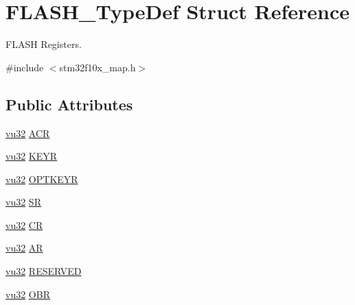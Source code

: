 \hypertarget{struct_f_l_a_s_h___type_def}{}\section{F\+L\+A\+S\+H\+\_\+\+Type\+Def Struct Reference}
\label{struct_f_l_a_s_h___type_def}


F\+L\+A\+SH Registers.  




{\ttfamily \#include $<$stm32f10x\+\_\+map.\+h$>$}

\subsection*{Public Attributes}
\begin{DoxyCompactItemize}
\item 
\hyperlink{agilefox_2library_2inc_2stm32f10x__type_8h_a6e2761f0a1011f84ed96b946f2c8a563}{vu32} \hyperlink{struct_f_l_a_s_h___type_def_aa1cc4da14ac887fbf7f6cef19179d8ba}{A\+CR}
\item 
\hyperlink{agilefox_2library_2inc_2stm32f10x__type_8h_a6e2761f0a1011f84ed96b946f2c8a563}{vu32} \hyperlink{struct_f_l_a_s_h___type_def_a88e0901a9f9b6c157448a2817c4f1c7f}{K\+E\+YR}
\item 
\hyperlink{agilefox_2library_2inc_2stm32f10x__type_8h_a6e2761f0a1011f84ed96b946f2c8a563}{vu32} \hyperlink{struct_f_l_a_s_h___type_def_af5b4bedcba9817f71402bf0718946f4c}{O\+P\+T\+K\+E\+YR}
\item 
\hyperlink{agilefox_2library_2inc_2stm32f10x__type_8h_a6e2761f0a1011f84ed96b946f2c8a563}{vu32} \hyperlink{struct_f_l_a_s_h___type_def_a83d84997ba34fe4ddf25146c85f29d5d}{SR}
\item 
\hyperlink{agilefox_2library_2inc_2stm32f10x__type_8h_a6e2761f0a1011f84ed96b946f2c8a563}{vu32} \hyperlink{struct_f_l_a_s_h___type_def_a79b1802363c3c5f33428f7b995496694}{CR}
\item 
\hyperlink{agilefox_2library_2inc_2stm32f10x__type_8h_a6e2761f0a1011f84ed96b946f2c8a563}{vu32} \hyperlink{struct_f_l_a_s_h___type_def_a162fff750708bbb533576ce52f30b64f}{AR}
\item 
\hyperlink{agilefox_2library_2inc_2stm32f10x__type_8h_a6e2761f0a1011f84ed96b946f2c8a563}{vu32} \hyperlink{struct_f_l_a_s_h___type_def_aedad829a49c236af05c13a075538fbcf}{R\+E\+S\+E\+R\+V\+ED}
\item 
\hyperlink{agilefox_2library_2inc_2stm32f10x__type_8h_a6e2761f0a1011f84ed96b946f2c8a563}{vu32} \hyperlink{struct_f_l_a_s_h___type_def_a159a8918ee3ccfb6e9488c48e37605c0}{O\+BR}

\end{DoxyCompactItemize}
